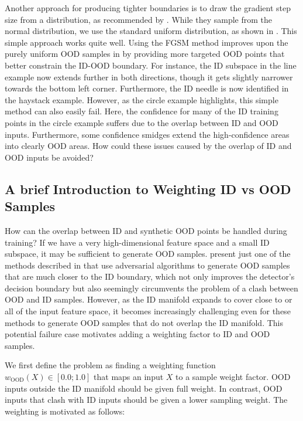 \noindent Another approach for producing tighter boundaries is to draw the gradient step size from a distribution, as recommended by \textcite{ood-boundary-2021}. While they sample from the normal distribution, we use the standard uniform distribution, as shown in . This simple approach works quite well. Using the FGSM method improves upon the purely uniform OOD samples in  by providing more targeted OOD points that better constrain the ID-OOD boundary. For instance, the ID subspace in the line example now extends further in both directions, though it gets slightly narrower towards the bottom left corner. Furthermore, the ID needle is now identified in the haystack example. However, as the circle example highlights, this simple method can also easily fail. Here, the confidence for many of the ID training points in the circle example suffers due to the overlap between ID and OOD inputs. Furthermore, some confidence smidges extend the high-confidence areas into clearly OOD areas. How could these issues caused by the overlap of ID and OOD inputs be avoided?

\subsection{A brief Introduction to Weighting ID vs OOD Samples} \label{txt:id-ood-weighting}

How can the overlap between ID and synthetic OOD points be handled during training? If we have a very high-dimensional feature space and a small ID subspace, it may be sufficient to generate OOD samples. \textcite{ood-training-2017} present just one of the methods described in  that use adversarial algorithms to generate OOD samples that are much closer to the ID boundary, which not only improves the detector's decision boundary but also seemingly circumvents the problem of a clash between OOD and ID samples. However, as the ID manifold expands to cover close to or all of the input feature space, it becomes increasingly challenging even for these methods to generate OOD samples that do not overlap the ID manifold. This potential failure case motivates adding a weighting factor to ID and OOD samples.

\newpar We first define the problem as finding a weighting function $w_{\text{OOD}}(X) \in [0.0; 1.0]$ that maps an input $X$ to a sample weight factor. OOD inputs outside the ID manifold should be given full weight. In contrast, OOD inputs that clash with ID inputs should be given a lower sampling weight. The weighting is motivated as follows:

